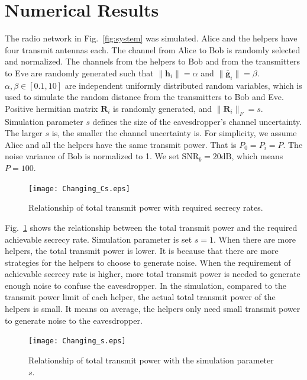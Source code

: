 \documentclass[journal]{IEEEtran}
\begin{document}
\section{Numerical Results} \label{sec:numerical results}
The radio network in Fig.~\ref{fig:system} was simulated. Alice and the helpers have four transmit antennas each. The channel from Alice to Bob is randomly selected and normalized. The channels from the helpers to Bob and from the transmitters to Eve are randomly generated such that $\|\mathbf{h}_i\| = \alpha$ and $\|\bar{\mathbf{g}}_i\| = \beta$. $\alpha,\beta\in  [0.1,10]$ are independent uniformly distributed random variables, which is used to simulate the random distance from the transmitters to Bob and Eve. 
Positive hermitian matrix $\mathbf{R}_i$ is randomly generated, and $\|\mathbf{R}_i\|_F = s$. Simulation parameter $s$ defines the size of the eavesdropper's channel uncertainty. The larger $s$ is, the smaller the channel uncertainty is. 
For simplicity, we assume Alice and all the helpers have the same transmit power. That is $P_0=P_i = P$. 
The noise variance of Bob is normalized to 1. We set $\mathrm{SNR}_b = 20 \mathrm{dB}$, which means $P = 100$.


\begin{figure}[!ht]
	\centering
	\texttt{[image: Changing\_Cs.eps]} %
	\caption{Relationship of total transmit power with required secrecy rates.}
	\label{fig:Changing_Cs}
\end{figure}

Fig.~\ref{fig:Changing_Cs} shows the relationship between the total transmit power and the required achievable secrecy rate. Simulation parameter is set $s = 1$. When there are more helpers, the total transmit power is lower. It is because that there are more strategies for the helpers to choose to generate noise. When the requirement of achievable secrecy rate is higher, more total transmit power is needed to generate enough noise to confuse the eavesdropper. In the simulation, compared to the transmit power limit of each helper, the actual total transmit power of the helpers is small. It means on average, the helpers only need small transmit power to generate noise to the eavesdropper.

\begin{figure}[!ht]
	\centering
	\texttt{[image: Changing\_s.eps]} %
	\caption{Relationship of total transmit power with the simulation parameter $s$.}
	\label{fig:Changing_s}
\end{figure}
\end{document}
